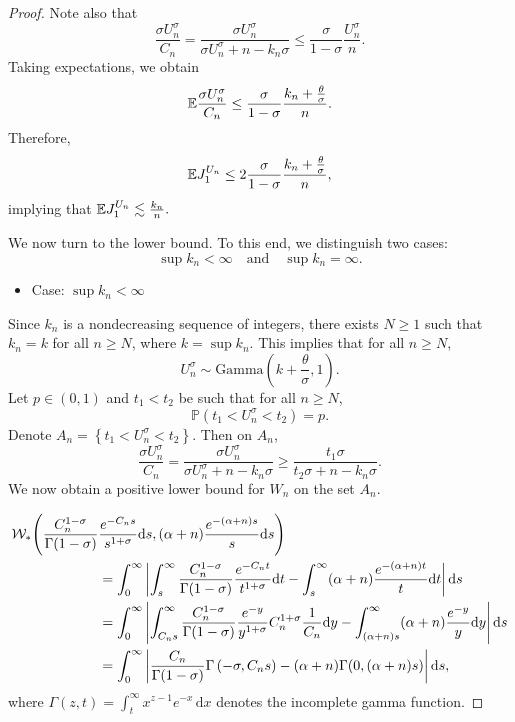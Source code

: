 \begin{proof}
    Note also that
    \[
    \frac{\sigma U_n^\sigma}{C_n} = \frac{\sigma U_n^\sigma}{\sigma U_n^\sigma + n - k_n\sigma} \leq \frac{\sigma}{1-\sigma}\frac{U_n^\sigma}{n}.
    \]
    Taking expectations, we obtain
    \[
    \mathbb{E} \frac{\sigma U_n^\sigma}{C_n} \leq \frac{\sigma}{1-\sigma}\frac{k_n + \frac{\theta}{\sigma}}{n}.
    \]
    Therefore,
    \[
    \mathbb{E} J_1^{U_n} \leq 2\frac{\sigma}{1-\sigma}\frac{k_n + \frac{\theta}{\sigma}}{n},
    \]
    implying that $\mathbb{E} J_1^{U_n}\lesssim \frac{k_n}{n}.$

    We now turn to the lower bound. To this end, we distinguish two cases:
    \[
    \sup k_n < \infty \quad \text{and} \quad \sup k_n = \infty.
    \]
    \begin{itemize}
        \item Case: $\sup k_n < \infty$
    \end{itemize}
    Since $k_n$ is a nondecreasing sequence of integers, there exists $N \geq 1$ such that $k_n = k$ for all $n \geq N$, where $k = \sup k_n$. This implies that for all $n \geq N$,
    \[
    U_n^\sigma \sim \mathrm{Gamma}\left(k +\frac{\theta}{\sigma},1\right).
    \]
    Let $p \in (0,1)$ and $t_1 < t_2$ be such that for all $n \geq N$,
    \[
    \mathbb{P}\left(t_1 < U_n^\sigma < t_2\right) = p.
    \]
    Denote $A_n = \left\{ t_1 < U_n^\sigma < t_2 \right\}$. Then on $A_n$,
    \[
    \frac{\sigma U_n^\sigma}{C_n} = \frac{\sigma U_n^\sigma}{\sigma U_n^\sigma + n - k_n\sigma} \geq \frac{t_1 \sigma}{t_2 \sigma + n - k_n\sigma}.
    \]
    We now obtain a positive lower bound for $W_n$ on the set $A_n$.

    \begin{align*}
        \mathcal{W}_*\Bigg(\frac{C_n^{1-\sigma}}{\Gamma(1-\sigma)}&\frac{e^{-C_ns}}{s^{1+\sigma}}\mathrm{d}s,
                  (\alpha + n)\frac{e^{-(\alpha + n)s}}{s}\mathrm{d}s\Bigg)  \\
        & =\int_0^\infty \left| \int_s^\infty \frac{C_n^{1-\sigma}}{\Gamma(1-\sigma)}\frac{e^{-C_nt}}{t^{1+\sigma}}\mathrm{d}t - \int_s^\infty (\alpha + n)\frac{e^{-(\alpha + n)t}}{t}\mathrm{d}t\right|\mathrm{d}s \\
        & = \int_0^\infty \left|\int_{C_ns}^\infty \frac{C_n^{1-\sigma}}{\Gamma(1-\sigma)}\frac{e^{-y}}{y^{1+\sigma}}C_n^{1+\sigma} \frac{1}{C_n}\mathrm{d}y -
        \int_{(\alpha+n)s}^\infty (\alpha + n) \frac{e^{-y}}{y}\mathrm{d}y\right|\mathrm{d}s \\
        & = \int_0^\infty \left| \frac{C_n}{\Gamma(1-\sigma)}\Gamma\left(-\sigma, C_ns\right) - (\alpha + n)\Gamma(0, (\alpha + n)s)\right|\mathrm{d}s,
    \end{align*}
    where $\Gamma(z,t) = \int_t^\infty x^{z-1}e^{-x}\,\mathrm{d}x$ denotes the incomplete gamma function.


\end{proof}
